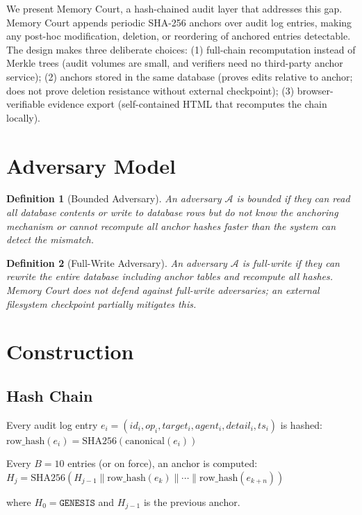 \documentclass[sigconf,nonacm]{acmart}
\newtheorem{definition}{Definition}
\begin{document}
We present Memory Court, a hash-chained audit layer that addresses this gap. Memory Court appends periodic SHA-256 anchors over audit log entries, making any post-hoc modification, deletion, or reordering of anchored entries detectable. The design makes three deliberate choices: (1) full-chain recomputation instead of Merkle trees (audit volumes are small, and verifiers need no third-party anchor service); (2) anchors stored in the same database (proves edits relative to anchor; does not prove deletion resistance without external checkpoint); (3) browser-verifiable evidence export (self-contained HTML that recomputes the chain locally).

\section{Adversary Model}

\begin{definition}[Bounded Adversary]
An adversary $\mathcal{A}$ is \emph{bounded} if they can read all database contents or write to database rows but do not know the anchoring mechanism or cannot recompute all anchor hashes faster than the system can detect the mismatch.
\end{definition}

\begin{definition}[Full-Write Adversary]
An adversary $\mathcal{A}$ is \emph{full-write} if they can rewrite the entire database including anchor tables and recompute all hashes. Memory Court does not defend against full-write adversaries; an external filesystem checkpoint partially mitigates this.
\end{definition}

\section{Construction}

\subsection{Hash Chain}
Every audit log entry $e_i = (id_i, op_i, target_i, agent_i, detail_i, ts_i)$ is hashed:
$\text{row\_hash}(e_i) = \text{SHA256}(\text{canonical}(e_i))$

Every $B = 10$ entries (or on force), an anchor is computed:
$H_j = \text{SHA256}(H_{j-1} \| \text{row\_hash}(e_{k}) \| \cdots \| \text{row\_hash}(e_{k+n}))$

where $H_0 = \texttt{GENESIS}$ and $H_{j-1}$ is the previous anchor.
\end{document}
